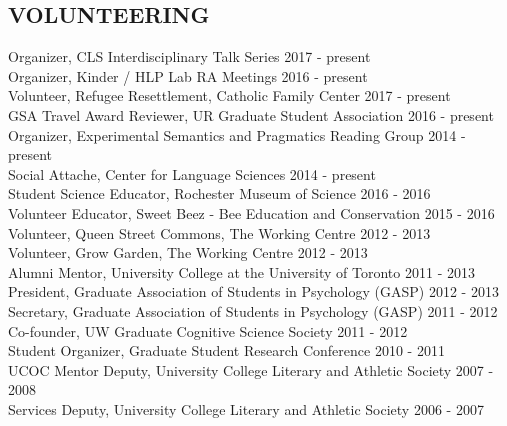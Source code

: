 \documentclass[margin, 7pt]{res} %
\begin{document}
\begin{resume}
\section{VOLUNTEERING} 

Organizer, CLS Interdisciplinary Talk Series \hfill 2017 - present \\
Organizer, Kinder / HLP Lab RA Meetings \hfill 2016 - present \\
Volunteer, Refugee Resettlement, Catholic Family Center \hfill 2017 - present \\
GSA Travel Award Reviewer, UR Graduate Student Association \hfill 2016 - present \\
Organizer, Experimental Semantics and Pragmatics Reading Group \hfill 2014 - present \\
Social Attache, Center for Language Sciences	\hfill 2014 - present \\
Student Science Educator, Rochester Museum of Science \hfill 2016 - 2016 \\
Volunteer Educator, Sweet Beez - Bee Education and Conservation	\hfill 2015 - 2016 \\
Volunteer, Queen Street Commons, The Working Centre	\hfill2012 - 2013 \\
Volunteer, Grow Garden, The Working Centre	\hfill 2012 - 2013 \\
Alumni Mentor, University College at the University of Toronto 	\hfill 2011 - 2013 \\
President, Graduate Association of Students in Psychology (GASP) 	\hfill 2012 - 2013 \\
Secretary, Graduate Association of Students in Psychology (GASP)	\hfill 2011 - 2012 \\
Co-founder, UW Graduate Cognitive Science Society \hfill	 2011 - 2012 \\
Student Organizer, Graduate Student Research Conference	\hfill 2010 - 2011 \\
UCOC Mentor Deputy, University College Literary and Athletic Society	\hfill 2007 - 2008 \\
Services Deputy, University College Literary and Athletic Society	\hfill 2006 - 2007


\end{resume}
\end{document}
